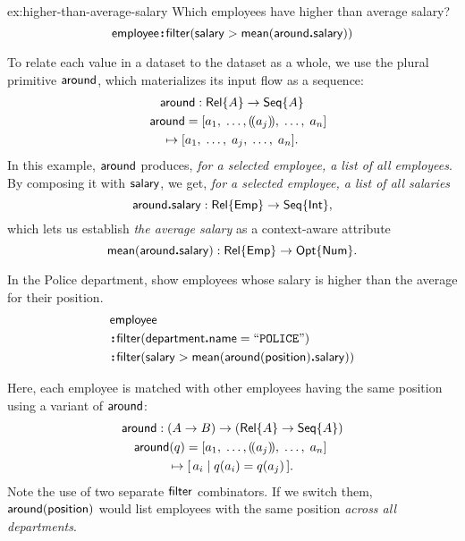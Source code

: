 \begin{demobis}{ex:higher-than-average-salary}
    Which employees have higher than average salary?
    \begin{equation*}
        \mathsf{employee}\!\boldsymbol{:}\!\mathsf{filter}(\mathsf{salary} > \mathsf{mean}(\mathsf{around}\boldsymbol{.}\mathsf{salary}))
    \end{equation*}
\end{demobis}

To relate each value in a dataset to the dataset as a whole, we use the plural
primitive $\mathsf{around}$, which materializes its input flow as a sequence:
\begin{multline*}
    \Around : \Rel{A} \to \Seq{A} \\
    \shoveleft{\Around = [a_1,\;\ldots,\selected{a_j},\;\ldots,\;a_n]} \\
    \mapsto [a_1,\;\ldots,\;a_j,\;\ldots,\;a_n].
\end{multline*}
In this example, $\mathsf{around}$ produces, \emph{for a selected employee, a list of
all employees}.  By composing it with $\mathsf{salary}$, we get, \emph{for a selected
employee, a list of all salaries}
\begin{equation*}
    \mathsf{around}\boldsymbol{.}\mathsf{salary} : \mathsf{Rel}{\left\{\mathsf{Emp}\right\}} \to \mathsf{Seq}{\left\{\mathsf{Int}\right\}},
\end{equation*}
which lets us establish \emph{the average salary} as a context-aware attribute
\begin{equation*}
    \mathsf{mean}(\mathsf{around}\boldsymbol{.}\mathsf{salary}) : \mathsf{Rel}{\left\{\mathsf{Emp}\right\}} \to \mathsf{Opt}{\left\{\mathsf{Num}\right\}}.
\end{equation*}

\begin{demo}
    \label{ex:higher-than-average-salary-by-position}
    In the Police department, show employees whose salary is higher than the
    average for their position.
    \begin{align*}
        & \mathsf{employee} \\
        & \!\boldsymbol{:}\!\mathsf{filter}(\mathsf{department}\boldsymbol{.}\mathsf{name}=\mathtt{``POLICE"}) \\
        & \!\boldsymbol{:}\!\mathsf{filter}(\mathsf{salary} > \mathsf{mean}(\mathsf{around}(\mathsf{position})\boldsymbol{.}\mathsf{salary}))
    \end{align*}
\end{demo}

Here, each employee is matched with other employees having the same position
using a variant of $\mathsf{around}$:
\begin{multline*}
    \Around : (A \to B) \to (\Rel{A} \to \Seq{A}) \\
    \shoveleft{\Around(q) = [a_1,\;\ldots,\selected{a_j},\;\ldots,\;a_n]} \\
    \mapsto [\,a_i \mid q(a_i)=q(a_j)\,].
\end{multline*}
Note the use of two separate $\mathsf{filter}$ combinators.  If we switch them,
$\mathsf{around}(\mathsf{position})$ would list employees with the same position \emph{across
all departments}.


